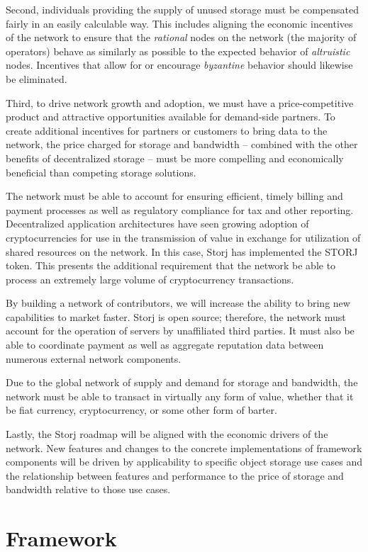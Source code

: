 \documentclass[11pt,fleqn,openany]{book}
\begin{document}
Second, individuals providing the supply of unused storage must
be compensated fairly in an easily calculable way.
This includes aligning the economic incentives of the network to ensure
that the {\em rational} nodes on the network (the majority of operators) behave
as similarly as possible to the expected behavior of {\em altruistic} nodes.
Incentives that allow for or encourage {\em byzantine} behavior should likewise
be eliminated.

Third, to drive network growth and adoption, we must have a price-competitive
product and attractive
opportunities available for demand-side partners. To create additional
incentives for partners or customers to bring data to the network,
the price charged for storage and bandwidth -- combined with the other
benefits of decentralized storage -- must be
more compelling and economically beneficial than competing storage solutions.

The network must be able to account for ensuring efficient, timely billing
and payment processes as well as regulatory compliance for tax and other reporting.
Decentralized application architectures have seen growing adoption of
cryptocurrencies for use in the transmission of value in
exchange for utilization of shared resources on the network.
In this case, Storj has implemented the STORJ token.
This presents the additional requirement that the network be able to process
an extremely large volume of cryptocurrency transactions.

By building a network of contributors, we will increase the ability to bring new
capabilities to market faster.
Storj is open source; therefore, the network must account for the operation of
servers by unaffiliated third parties. It must also be able to coordinate payment
as well as aggregate reputation data between numerous external network
components.

Due to the global network of supply and demand for storage and bandwidth, the
network must be able to transact in virtually any form of value, whether that it
be fiat currency, cryptocurrency, or some other form of barter.

Lastly, the Storj roadmap will be aligned with the economic drivers of the
network.
New features and changes to the concrete implementations of framework
components will be driven by applicability to specific object storage use cases
and the relationship between features and performance to the price of storage
and bandwidth relative to those use cases.

\chapter{Framework}\label{chap:framework}
\end{document}
